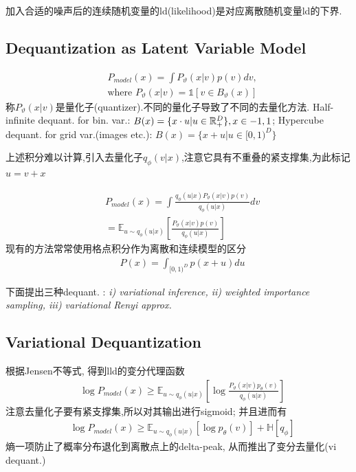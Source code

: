 \documentclass{article}
\begin{document}
     加入合适的噪声后的连续随机变量的ld(likelihood)是对应离散随机变量ld的下界.
    \newcommand{\deq}{q_\phi(u|x)}
\subsection{Dequantization as Latent Variable Model}

    \begin{align}
        &P_{model}(x)=\int P_\vartheta(x|v)p(v)dv,\\
        &\text{where } P_\vartheta(x|v) = \mathbb{1} [v\in B_\vartheta(x)] 
    \end{align}
    称$P_\vartheta(x|v)$是量化子(quantizer).不同的量化子导致了不同的去量化方法. Half-infinite dequant. for bin. var.: $B(x)=\{x\cdot u|u\in \mathbb{R}^D_+\},x\in{-1, 1}$; Hypercube dequant. for grid var.(images etc.): $B(x)=\{x+ u|u\in {[0, 1)}^D\}$
    
    上述积分难以计算,引入去量化子$q_\phi(v|x)$,注意它具有不重叠的紧支撑集,为此标记$u=v+x$
    
    \begin{align}
        &P_{model}(x)=\int \frac{q_\phi(u|x)P_\vartheta(x|v)p(v)}{q_\phi(u|x)}dv\\
        &=\mathbb E_{u\sim \deq}\left[
            \frac{P_\vartheta(x|v)p(v)}{\deq}
        \right]
    \end{align}
    现有的方法常常使用格点积分作为离散和连续模型的区分
    \begin{align}
        &P(x)=\int_{[0, 1)^D} p(x+u) du
    \end{align}

    下面提出三种dequant. : \textit{i) variational inference, ii) weighted importance sampling, iii) variational Renyi approx.}

\subsection{Variational Dequantization}

    根据Jensen不等式, 得到lld的变分代理函数
    \begin{align}
        &\log P_{model}(x) \ge 
        \mathbb E_{u\sim \deq}\left[
            \log \frac{P_\vartheta(x|v)p_\theta(v)}{\deq}
        \right]
    \end{align}
    注意去量化子要有紧支撑集,所以对其输出进行sigmoid; 并且进而有
    \begin{align}
        &\log P_{model}(x) \ge 
        \mathbb E_{u\sim \deq}\left[\log p_\theta(v)\right] + \mathbb H[q_\phi]
    \end{align}
    熵一项防止了概率分布退化到离散点上的delta-peak, 从而推出了变分去量化(vi dequant.)
\end{document}
